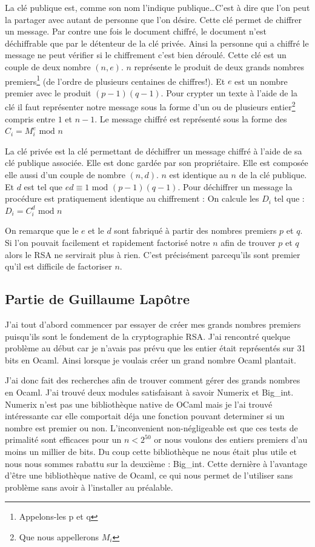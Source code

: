 \documentclass[a4paper,12pt]{article}
\begin{document}
		La clé publique est, comme son nom l'indique publique\dots C'est à dire que l'on peut la partager avec autant de personne que l'on désire. Cette clé permet de chiffrer un message. Par contre une fois le document chiffré, le document n'est déchiffrable que par le détenteur de la clé privée. Ainsi la personne qui a chiffré le message ne peut vérifier si le chiffrement c'est bien déroulé. Cette clé est un couple de deux nombre $(n,e)$. $n$ représente le produit de deux grands nombres premiers\footnote{Appelons-les p et q} (de l'ordre de plusieurs centaines de chiffres!). Et $e$ est un nombre premier avec le produit $(p - 1)(q - 1)$. Pour crypter un texte à l'aide de la clé il faut représenter notre message sous la forme d'un ou de plusieurs entier\footnote{Que nous appellerons $M_{i}$} compris entre $1$ et $n-1$. Le message chiffré est représenté sous la forme des $C_{i} = M_{i}^e \textrm{ mod } n$
		
		La clé privée est la clé permettant de déchiffrer un message chiffré à l'aide de sa clé publique associée. Elle est donc gardée par son propriétaire. Elle est composée elle aussi d'un couple de nombre $(n,d)$. $n$ est identique au $n$ de la clé publique. Et $d$ est tel que $ed \equiv 1 \textrm{ mod } (p - 1)(q - 1)$. Pour déchiffrer un message la procédure est pratiquement identique au chiffrement : On calcule les $D_{i}$ tel que : $D_{i} = C_{i}^d \textrm{ mod } n$
		
		On remarque que le $e$ et le $d$ sont fabriqué à partir des nombres premiers $p$ et $q$. Si l'on pouvait facilement et rapidement factorisé notre $n$ afin de trouver $p$ et $q$ alors le RSA ne servirait plus à rien. C'est précisément parcequ'ils sont premier qu'il est difficile de factoriser $n$.  
		
		\subsection{Partie de Guillaume Lap\^{o}tre}
			J'ai tout d'abord commencer par essayer de créer mes grands nombres premiers puisqu'ils sont le fondement de la 
		cryptographie RSA. J'ai rencontré quelque problème au début car je n'avais pas prévu que les entier était représentés sur 
		31 bits en Ocaml. Ainsi lorsque je voulais créer un grand nombre Ocaml plantait.
		
		J'ai donc fait des recherches afin de 
		trouver comment gérer des grands nombres en Ocaml. J'ai trouvé deux modules satisfaisant à savoir Numerix et Big\_int. Numerix
		n'est pas une bibliothèque native de OCaml mais je l'ai trouvé intéressante car elle comportait déja une fonction pouvant  		
		determiner si un nombre est premier ou non. L'inconvenient non-négligeable est que ces tests de primalité sont efficaces pour 
		un $n < 2^{50}$ or nous voulons des entiers premiers d'au moins un millier de bits. Du coup cette bibliothèque ne nous était 
		plus utile et nous nous sommes rabattu sur la deuxième : Big\_int. Cette dernière à l'avantage d'être une bibliothèque native 
		de Ocaml, ce qui nous permet de l'utiliser sans problème sans avoir à l'installer au préalable.
		
\end{document}
